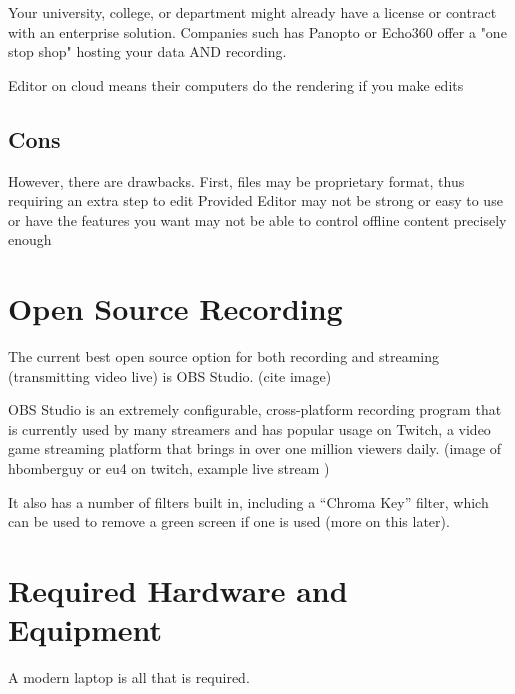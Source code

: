 \documentclass[sigconf]{acmart}
\begin{document}
Your university, college, or department might already have a license or contract with an enterprise solution.
Companies such has Panopto or Echo360 offer a "one stop shop" hosting your data AND recording.


Editor on cloud means their computers do the rendering if you make edits

\subsection{Cons}

However, there are drawbacks.
First, files may be proprietary format, thus requiring an extra step to edit
Provided Editor may not be strong or easy to use or have the features you want
may not be able to control offline content precisely enough


\section{Open Source Recording}
\label{opensource}
The current best open source option for both recording and streaming (transmitting video live) is OBS Studio. (cite image)

OBS Studio is an extremely configurable, cross-platform recording program that is currently used by many streamers and has popular usage on Twitch, a video game streaming platform that brings in over one million viewers daily.  (image of hbomberguy or eu4 on twitch, example live stream )

It also has a number of filters built in, including a  ``Chroma Key'' filter, which can be used to remove a green screen if one is used (more on this later).



\section{Required Hardware and Equipment}
\label{hardware}
A modern laptop is all that is required.


\end{document}

